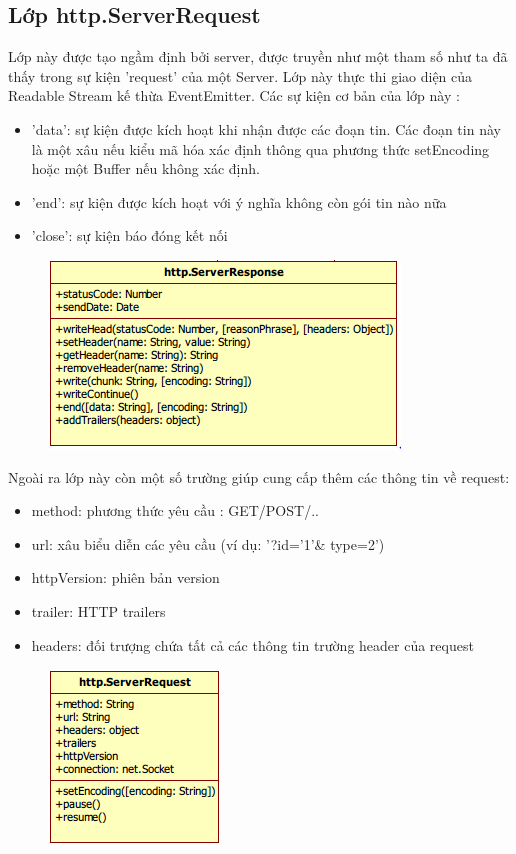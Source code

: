 	\subsection{Lớp http.ServerRequest}
		
		Lớp này được tạo ngầm định bởi server, được truyền như một tham số như ta đã thấy trong sự kiện 'request' của một Server. Lớp này thực thi giao diện của Readable Stream kế thừa EventEmitter. Các sự kiện cơ bản của lớp này :
		\begin{itemize}
			\item 'data': sự kiện được kích hoạt khi nhận được các đoạn tin. Các đoạn tin này là một xâu nếu kiểu mã hóa xác định thông qua phương thức setEncoding hoặc một Buffer nếu không xác định.
			\item 'end': sự kiện được kích hoạt với ý nghĩa không còn gói tin nào nữa
			\item 'close': sự kiện báo đóng kết nối
		\end{itemize}
		
		\begin{figure}[h]
			\centering
			\includegraphics[scale=0.7]{3_3_3}
		\end{figure}

		Ngoài ra lớp này còn một số trường giúp cung cấp thêm các thông tin về request:
		\begin{itemize}
			\item method: phương thức yêu cầu : GET/POST/..
			\item url:  xâu biểu diễn các yêu cầu (ví dụ: '?id='1'\& type=2')
			\item httpVersion: phiên bản version
			\item trailer: HTTP trailers
			\item headers: đối trượng chứa tất cả các thông tin trường header của request
		\end{itemize}
		
		\begin{figure}[h]
			\centering
			\includegraphics[scale=0.7]{3_3_4}
		\end{figure}				
		
